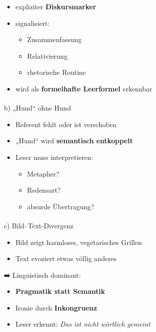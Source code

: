 \documentclass[
  letterpaper,
  DIV=11,
  numbers=noendperiod]{scrartcl}
\makeatletter
\let\oldparagraph\paragraph
\renewcommand{\paragraph}{
    \@ifstar
      \xxxParagraphStar
      \xxxParagraphNoStar
  }
\newcommand{\xxxParagraphStar}[1]{\oldparagraph*{#1}\mbox{}}
\newcommand{\xxxParagraphNoStar}[1]{\oldparagraph{#1}\mbox{}}
\providecommand{\tightlist}{%
  \setlength{\itemsep}{0pt}\setlength{\parskip}{0pt}}
\makeatother
\begin{document}
\begin{itemize}
\item
  expliziter \textbf{Diskursmarker}
\item
  signalisiert:

  \begin{itemize}
  \tightlist
  \item
    Zusammenfassung
  \item
    Relativierung
  \item
    rhetorische Routine
  \end{itemize}
\item
  wird als \textbf{formelhafte Leerformel} erkennbar
\end{itemize}

\paragraph{b) „Hund`` ohne Hund}\label{b-hund-ohne-hund}

\begin{itemize}
\item
  Referent fehlt oder ist verschoben
\item
  „Hund`` wird \textbf{semantisch entkoppelt}
\item
  Leser muss interpretieren:

  \begin{itemize}
  \tightlist
  \item
    Metapher?
  \item
    Redensart?
  \item
    absurde Übertragung?
  \end{itemize}
\end{itemize}

\paragraph{c) Bild--Text-Divergenz}\label{c-bildtext-divergenz}

\begin{itemize}
\tightlist
\item
  Bild zeigt harmloses, vegetarisches Grillen
\item
  Text evoziert etwas völlig anderes
\end{itemize}

➡️ Linguistisch dominant:

\begin{itemize}
\tightlist
\item
  \textbf{Pragmatik statt Semantik}
\item
  Ironie durch \textbf{Inkongruenz}
\item
  Leser erkennt: \emph{Das ist nicht wörtlich gemeint}
\end{itemize}
\end{document}
